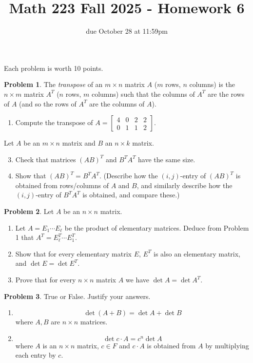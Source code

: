 \documentclass[12pt, oneside]{amsart}
\title{Math 223 Fall 2025 - Homework 6}
\author{due October 28 at 11:59pm}
\theoremstyle{definition}
\newtheorem{prob}{Problem}
\begin{document}
\maketitle
Each problem is worth 10 points.

\begin{prob}
    The \emph{transpose} of an $m\times n$ matrix $A$ ($m$ rows, $n$ columns) is the $n\times m$ matrix $A^T$ ($n$ rows, $m$ columns) such that the columns of $A^T$ are the rows of $A$ (and so the rows of $A^T$ are the columns of $A$).

    \begin{enumerate}
        \item Compute the transpose of $A = \left[\begin{matrix}
        4 & 0 & 2 & 2 \\
        0 & 1 & 1 & 2
        \end{matrix}\right]$.
    \end{enumerate}
    Let $A$ be an $m\times n$ matrix and $B$ an $n\times k$ matrix.
    \begin{enumerate}
    \setcounter{enumi}{2}
    \item Check that matrices $(AB)^T$ and $B^T A^T$ have the same size.
    \item Show that $(AB)^T = B^T A^T$. 
    (Describe how the $(i,j)$-entry of $(AB)^T$ is obtained from rows/columns of $A$ and $B$, and similarly describe how the $(i,j)$-entry of $B^T A^T$ is obtained, and compare these.)
    \end{enumerate}
\end{prob}


\begin{prob} Let $A$ be an $n\times n$ matrix. 
    \begin{enumerate}
    \item Let $A = E_1\cdots E_\ell$ be the product of elementary matrices. Deduce from Problem 1 that $A^T = E_\ell^T \cdots E_1^T$.
    
    \item Show that for every elementary matrix $E$, $E^T$ is also an elementary matrix, and $\det E = \det E^T$.
    
    \item Prove that for every $n\times n$ matrix $A$ we have $\det A = \det A^T$.
    \end{enumerate}
\end{prob}

\begin{prob} True or False. Justify your answers.
\begin{enumerate}
    \item  $$\det (A+B) = \det A  +\det B$$ where $A,B$ are $n\times n$ matrices.
    
    \item $$\det c\cdot A = c^n \det A$$ where $A$ is an $n\times n$ matrix, $c\in F$ and $c\cdot A$ is obtained from $A$ by multiplying each entry by $c$.
\end{enumerate}
\end{prob}
\end{document}
